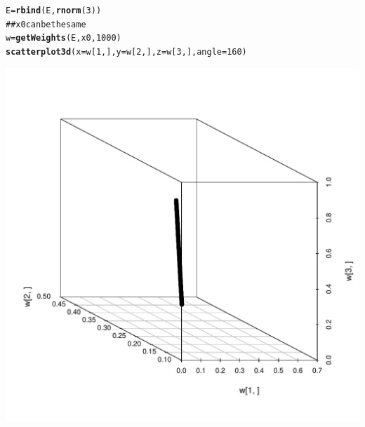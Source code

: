 \documentclass{article}\usepackage{graphicx, color}
\makeatletter
\def\maxwidth{ %
  \ifdim\Gin@nat@width>\linewidth
    \linewidth
  \else
    \Gin@nat@width
  \fi
}
\newcommand{\hlfunctioncall}[1]{\textcolor[rgb]{0.501960784313725,0,0.329411764705882}{\textbf{#1}}}%
\newcommand{\hlcomment}[1]{\textcolor[rgb]{0.180392156862745,0.6,0.341176470588235}{#1}}%
\newenvironment{kframe}{%
 \def\at@end@of@kframe{}%
 \ifinner\ifhmode%
  \def\at@end@of@kframe{\end{minipage}}%
  \begin{minipage}{\columnwidth}%
 \fi\fi%
 \def\FrameCommand##1{\hskip\@totalleftmargin \hskip-\fboxsep
 \colorbox{shadecolor}{##1}\hskip-\fboxsep
     \hskip-\linewidth \hskip-\@totalleftmargin \hskip\columnwidth}%
 \MakeFramed {\advance\hsize-\width
   \@totalleftmargin\z@ \linewidth\hsize
   \@setminipage}}%
 {\par\unskip\endMakeFramed%
 \at@end@of@kframe}
\newenvironment{knitrout}{}{} %
\makeatother
\begin{document}
\begin{knitrout}
\color{fgcolor}\begin{kframe}
\begin{alltt}
E = \hlfunctioncall{rbind}(E, \hlfunctioncall{rnorm}(3))
\hlcomment{## x0 can be the same}
w = \hlfunctioncall{getWeights}(E, x0, 1000)
\hlfunctioncall{scatterplot3d}(x = w[1, ], y = w[2, ], z = w[3, ], angle = 160)
\end{alltt}
\end{kframe}
\includegraphics[width=\maxwidth]{figure/demo} 

\end{knitrout}
\end{document}
